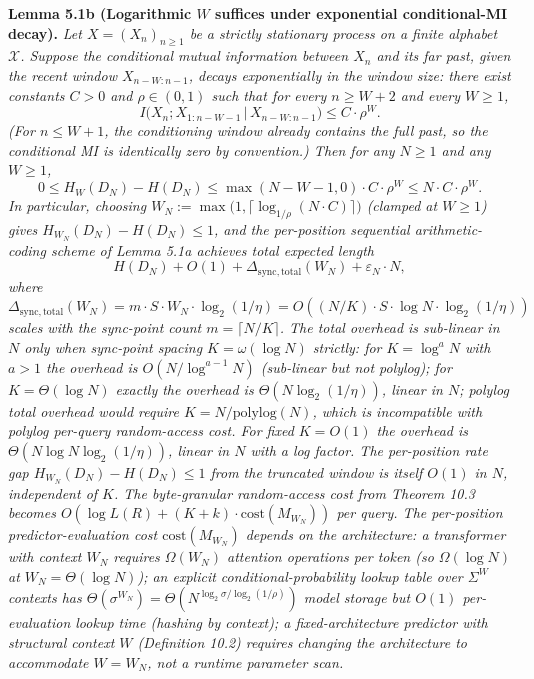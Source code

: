 \documentclass[
]{article}
\begin{document}
\textbf{Lemma 5.1b (Logarithmic $W$ suffices under exponential
conditional-MI decay).} \emph{Let $X = (X_n)_{n \geq 1}$ be a
strictly stationary process on a finite alphabet $\mathcal{X}$.
Suppose the conditional mutual information between $X_n$ and its
far past, given the recent window $X_{n-W:n-1}$, decays
exponentially in the window size: there exist constants $C > 0$ and
$\rho \in (0, 1)$ such that for every $n \geq W + 2$ and every
$W \geq 1$,}
\[
I\bigl(X_n ; X_{1:n-W-1} \,\big|\, X_{n-W:n-1}\bigr) \leq C \cdot \rho^W.
\tag{5.8}
\]
\emph{(For $n \leq W + 1$, the conditioning window already contains
the full past, so the conditional MI is identically zero by
convention.) Then for any $N \geq 1$ and any $W \geq 1$,}
\[
0 \leq H_W(D_N) - H(D_N) \leq \max(N - W - 1, 0) \cdot C \cdot \rho^W \leq N \cdot C \cdot \rho^W.
\]
\emph{In particular, choosing
$W_N := \max\bigl(1, \lceil \log_{1/\rho}(N \cdot C) \rceil\bigr)$
(clamped at $W \geq 1$) gives $H_{W_N}(D_N) - H(D_N) \leq 1$, and
the per-position sequential arithmetic-coding scheme of Lemma 5.1a
achieves total expected length}
\[
H(D_N) + O(1) + \Delta_{\mathrm{sync,total}}(W_N) + \varepsilon_N \cdot N,
\]
\emph{where $\Delta_{\mathrm{sync,total}}(W_N) = m \cdot S \cdot W_N
\cdot \log_2(1/\eta) = O((N/K) \cdot S \cdot \log N \cdot \log_2(1/\eta))$
scales with the sync-point count $m = \lceil N/K \rceil$. The total
overhead is sub-linear in $N$ only when sync-point spacing
$K = \omega(\log N)$ strictly: for $K = \log^a N$ with $a > 1$ the
overhead is $O(N/\log^{a-1} N)$ (sub-linear but \emph{not} polylog);
for $K = \Theta(\log N)$ exactly the overhead is $\Theta(N
\log_2(1/\eta))$, linear in $N$; polylog total overhead would
require $K = N/\mathrm{polylog}(N)$, which is incompatible with
polylog per-query random-access cost. For fixed $K = O(1)$ the
overhead is $\Theta(N \log N \log_2(1/\eta))$, linear in $N$ with
a log factor.
The per-position rate gap $H_{W_N}(D_N) - H(D_N) \leq 1$ from the
truncated window is itself $O(1)$ in $N$, independent of $K$.
The byte-granular random-access cost from Theorem 10.3 becomes
$O(\log L(R) + (K + k) \cdot \mathrm{cost}(M_{W_N}))$ per query. The per-position
predictor-evaluation cost $\mathrm{cost}(M_{W_N})$ depends on the
architecture: a transformer with context $W_N$ requires
$\Omega(W_N)$ attention operations per token (so $\Omega(\log N)$ at
$W_N = \Theta(\log N)$); an explicit conditional-probability lookup
table over $\Sigma^W$ contexts has $\Theta(\sigma^{W_N}) =
\Theta(N^{\log_2 \sigma / \log_2(1/\rho)})$ \emph{model storage} but
$O(1)$ per-evaluation lookup time (hashing by context);
a fixed-architecture predictor with structural context $W$
(Definition 10.2) requires changing the architecture to accommodate
$W = W_N$, not a runtime parameter scan.}
\end{document}
